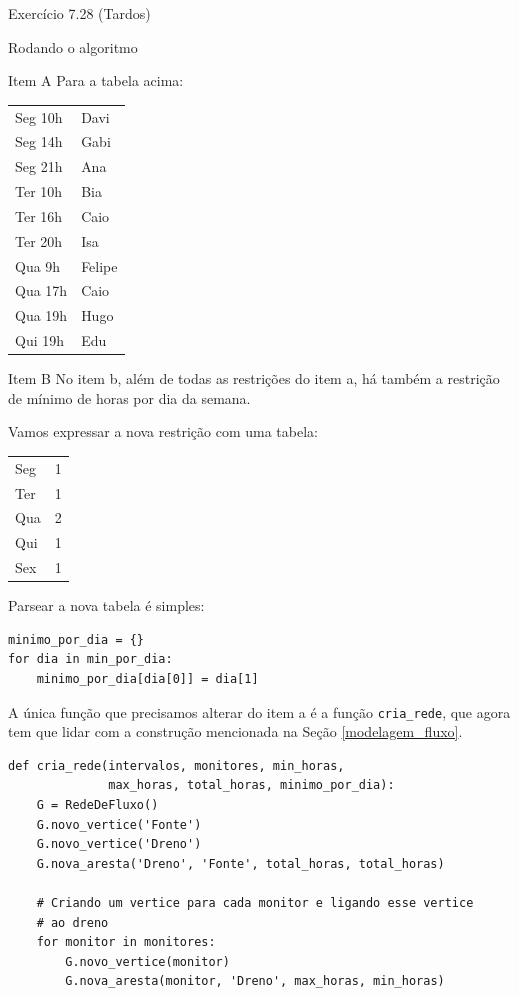 \documentclass[presentation]{beamer}
\begin{document}
\begin{frame}[fragile,label=sec-2]{Exercício 7.28 (Tardos)}
\begin{block}{Rodando o algoritmo}
\begin{block}{Item A}
Para a tabela acima:
\begin{center}
\begin{tabular}{ll}
Seg 10h & Davi\\
Seg 14h & Gabi\\
Seg 21h & Ana\\
Ter 10h & Bia\\
Ter 16h & Caio\\
Ter 20h & Isa\\
Qua 9h & Felipe\\
Qua 17h & Caio\\
Qua 19h & Hugo\\
Qui 19h & Edu\\
\end{tabular}
\end{center}
\end{block}

\begin{block}{Item B}
No item b, além de todas as restrições do item a, há também a
restrição de mínimo de horas por dia da semana.

Vamos expressar a nova restrição com uma tabela:

\begin{center}
\begin{tabular}{lr}
Seg & 1\\
Ter & 1\\
Qua & 2\\
Qui & 1\\
Sex & 1\\
\end{tabular}
\end{center}

Parsear a nova tabela é simples:
\begin{verbatim}
minimo_por_dia = {}
for dia in min_por_dia:
    minimo_por_dia[dia[0]] = dia[1]
\end{verbatim}

A única função que precisamos alterar do item a é a função
\verb~cria_rede~, que agora tem que lidar com a construção mencionada na
Seção \ref{modelagem_fluxo}.

\begin{verbatim}
def cria_rede(intervalos, monitores, min_horas,
              max_horas, total_horas, minimo_por_dia):
    G = RedeDeFluxo()
    G.novo_vertice('Fonte')
    G.novo_vertice('Dreno')
    G.nova_aresta('Dreno', 'Fonte', total_horas, total_horas)

    # Criando um vertice para cada monitor e ligando esse vertice
    # ao dreno
    for monitor in monitores:
        G.novo_vertice(monitor)
        G.nova_aresta(monitor, 'Dreno', max_horas, min_horas)


\end{verbatim}
\end{block}
\end{block}
\end{frame}
\end{document}
